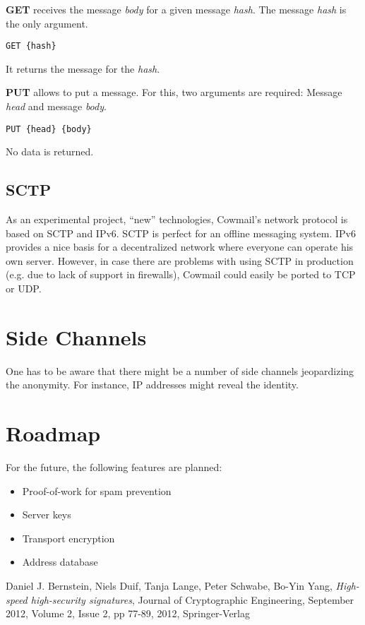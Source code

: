 \documentclass[a4paper]{article}
\begin{document}
\textbf{GET} receives the message \textit{body} for a given message
\textit{hash}. The message \textit{hash} is the only argument.
\begin{verbatim}
GET {hash}
\end{verbatim}
It returns the message for the \textit{hash}.

\textbf{PUT} allows to put a message. For this, two arguments are required:
Message \textit{head} and message \textit{body}.
\begin{verbatim}
PUT {head} {body}
\end{verbatim}
No data is returned.

\subsection{SCTP}
As an experimental project, “new” technologies, Cowmail's network protocol is
based on SCTP and IPv6. SCTP is perfect for an offline messaging system. IPv6
provides a nice basis for a decentralized network where everyone can operate
his own server. However, in case there are problems with using SCTP in
production (e.g. due to lack of support in firewalls), Cowmail could easily be
ported to TCP or UDP.

\section{Side Channels}
One has to be aware that there might be a number of side channels jeopardizing
the anonymity. For instance, IP addresses might reveal the identity.

\section{Roadmap}
For the future, the following features are planned:
\begin{itemize}
\item Proof-of-work for spam prevention
\item Server keys
\item Transport encryption
\item Address database
\end{itemize}

\begin{thebibliography}{ABCDE99}

Daniel J. Bernstein, Niels Duif, Tanja Lange, Peter Schwabe, Bo-Yin Yang, 
\textit{High-speed high-security signatures}, 
Journal of Cryptographic Engineering,
September 2012, Volume 2, Issue 2, pp 77-89,
2012, Springer-Verlag

\end{thebibliography}
\end{document}
